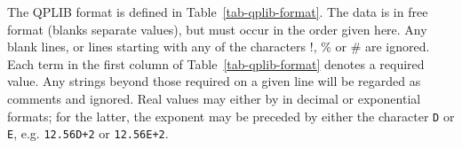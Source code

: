 
The QPLIB format is defined in Table~\ref{tab-qplib-format}.
The data is in free format (blanks separate values), but must occur in
the order given here. Any blank lines, or lines starting with any of the
characters !, \% or \# are ignored. Each term in the first column of
Table~\ref{tab-qplib-format} denotes a required value. Any strings beyond
those required on a given line will be regarded as comments and ignored.
Real values may either by in decimal or exponential formats; for the latter,
the exponent may be preceded by either the character \texttt{D} or \texttt{E},
e.g. \texttt{12.56D+2} or \texttt{12.56E+2}.

